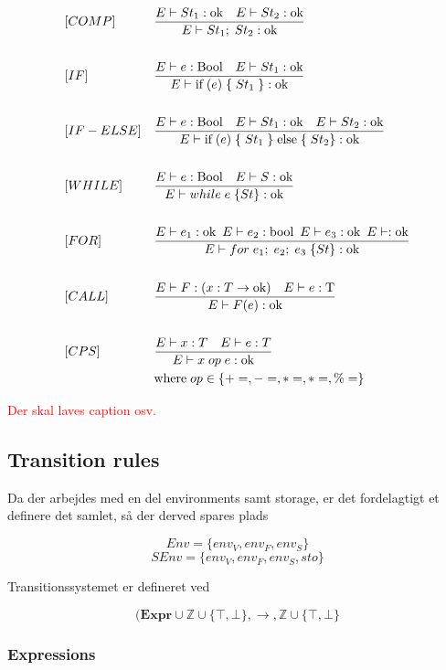 \begin{align*}
&[COMP] & &\frac{E \vdash St_1 : \text{ok}\quad E \vdash St_2 : \text{ok}}{E \vdash St_1;\;St_2 : \text{ok}}\\\\
&[IF] & &\frac{E \vdash e : \text{Bool}\quad E \vdash St_1 : \text{ok}}{E \vdash \text{if}\; (e)\; \{\; St_1\; \} : \text{ok}}\\\\
&[IF-ELSE] & &\frac{E \vdash e : \text{Bool}\quad E \vdash St_1 : \text{ok}\quad E \vdash St_2 : \text{ok}}{E \vdash \text{if}\; (e)\; \{\; St_1\; \}\; \text{else}\; \{\;St_2\} : \text{ok}}\\\\
&[WHILE] & &\frac{E \vdash e : \text{Bool}\quad E \vdash S : \text{ok}}{E \vdash while\; e\; \{St\} : \text{ok}}\\\\
&[FOR] & &\frac{E \vdash e_1 : \text{ok}\enskip E \vdash e_2 : \text{bool}\enskip E \vdash e_3 : \text{ok}\enskip E \vdash : \text{ok}}{E \vdash for\; e_1;\; e_2;\; e_3\; \{St\} : \text{ok}}\\\\
&[CALL] & &\frac{E \vdash F : (x : T \rightarrow \text{ok})\quad E \vdash e : \text{T}}{E \vdash F(e) : \text{ok}}\\\\
&[CPS] & &\frac{E \vdash x : T\quad E \vdash e : T}{E \vdash x\; op\; e : \text{ok}}\\
& & &\text{where}\; op \in \{+=, -=, *=, *=, \%=\}
\end{align*}
\pagebreak

\noindent \textcolor{red}{Der skal laves caption osv.}

\subsection{Transition rules}
Da der arbejdes med en del environments samt storage, er det fordelagtigt et definere det samlet, så der derved spares plads

$$ Env = \{env_V, env_F, env_S\} $$
$$ SEnv = \{env_V, env_F, env_S, sto\}$$

\noindent Transitionssystemet er defineret ved

$$ (\textbf{Expr} \cup \mathds{Z} \cup \{\top, \bot\}, \rightarrow, \mathds{Z} \cup \{\top, \bot\} $$

\subsubsection{Expressions}

